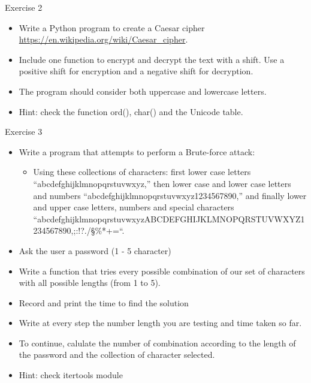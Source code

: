 \documentclass[
  8pt,
  ignorenonframetext,
]{beamer}
\providecommand{\tightlist}{%
  \setlength{\itemsep}{0pt}\setlength{\parskip}{0pt}}
\begin{document}
\begin{frame}{Exercise 2}
\protect\hypertarget{exercise-2}{}
\begin{itemize}
\tightlist
\item
  Write a Python program to create a Caesar cipher
  \url{https://en.wikipedia.org/wiki/Caesar_cipher}.
\item
  Include one function to encrypt and decrypt the text with a shift. Use
  a positive shift for encryption and a negative shift for decryption.
\item
  The program should consider both uppercase and lowercase letters.
\item
  Hint: check the function ord(), char() and the Unicode table.
\end{itemize}
\end{frame}

\begin{frame}{Exercise 3}
\protect\hypertarget{exercise-3}{}
\begin{itemize}
\tightlist
\item
  Write a program that attempts to perform a Brute-force attack:

  \begin{itemize}
  \tightlist
  \item
    Using these collections of characters: first lower case letters
    ``abcdefghijklmnopqrstuvwxyz,'' then lower case and lower case
    letters and numbers ``abcdefghijklmnopqrstuvwxyz1234567890,'' and
    finally lower and upper case letters, numbers and special characters
    ``abcdefghijklmnopqrstuvwxyzABCDEFGHIJKLMNOPQRSTUVWXYZ1234567890,;:!?./§\%*+=``.
  \end{itemize}
\item
  Ask the user a password (1 - 5 character)
\item
  Write a function that tries every possible combination of our set of
  characters with all possible lengths (from 1 to 5).
\item
  Record and print the time to find the solution
\item
  Write at every step the number length you are testing and time taken
  so far.
\item
  To continue, calulate the number of combination according to the
  length of the password and the collection of character selected.
\item
  Hint: check itertools module
\end{itemize}
\end{frame}
\end{document}
